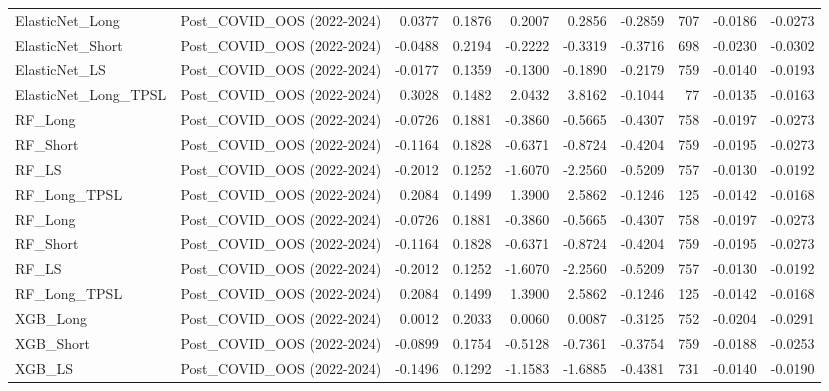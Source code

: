 \begin{tabular}{llrrrrrrrr}
\cline{1-10}
ElasticNet\_Long & Post\_COVID\_OOS (2022-2024) & 0.0377 & 0.1876 & 0.2007 & 0.2856 & -0.2859 & 707 & -0.0186 & -0.0273 \\
\cline{1-10}
ElasticNet\_Short & Post\_COVID\_OOS (2022-2024) & -0.0488 & 0.2194 & -0.2222 & -0.3319 & -0.3716 & 698 & -0.0230 & -0.0302 \\
\cline{1-10}
ElasticNet\_LS & Post\_COVID\_OOS (2022-2024) & -0.0177 & 0.1359 & -0.1300 & -0.1890 & -0.2179 & 759 & -0.0140 & -0.0193 \\
\cline{1-10}
ElasticNet\_Long\_TPSL & Post\_COVID\_OOS (2022-2024) & 0.3028 & 0.1482 & 2.0432 & 3.8162 & -0.1044 & 77 & -0.0135 & -0.0163 \\
\cline{1-10}
RF\_Long & Post\_COVID\_OOS (2022-2024) & -0.0726 & 0.1881 & -0.3860 & -0.5665 & -0.4307 & 758 & -0.0197 & -0.0273 \\
\cline{1-10}
RF\_Short & Post\_COVID\_OOS (2022-2024) & -0.1164 & 0.1828 & -0.6371 & -0.8724 & -0.4204 & 759 & -0.0195 & -0.0273 \\
\cline{1-10}
RF\_LS & Post\_COVID\_OOS (2022-2024) & -0.2012 & 0.1252 & -1.6070 & -2.2560 & -0.5209 & 757 & -0.0130 & -0.0192 \\
\cline{1-10}
RF\_Long\_TPSL & Post\_COVID\_OOS (2022-2024) & 0.2084 & 0.1499 & 1.3900 & 2.5862 & -0.1246 & 125 & -0.0142 & -0.0168 \\
\cline{1-10}
RF\_Long & Post\_COVID\_OOS (2022-2024) & -0.0726 & 0.1881 & -0.3860 & -0.5665 & -0.4307 & 758 & -0.0197 & -0.0273 \\
\cline{1-10}
RF\_Short & Post\_COVID\_OOS (2022-2024) & -0.1164 & 0.1828 & -0.6371 & -0.8724 & -0.4204 & 759 & -0.0195 & -0.0273 \\
\cline{1-10}
RF\_LS & Post\_COVID\_OOS (2022-2024) & -0.2012 & 0.1252 & -1.6070 & -2.2560 & -0.5209 & 757 & -0.0130 & -0.0192 \\
\cline{1-10}
RF\_Long\_TPSL & Post\_COVID\_OOS (2022-2024) & 0.2084 & 0.1499 & 1.3900 & 2.5862 & -0.1246 & 125 & -0.0142 & -0.0168 \\
\cline{1-10}
XGB\_Long & Post\_COVID\_OOS (2022-2024) & 0.0012 & 0.2033 & 0.0060 & 0.0087 & -0.3125 & 752 & -0.0204 & -0.0291 \\
\cline{1-10}
XGB\_Short & Post\_COVID\_OOS (2022-2024) & -0.0899 & 0.1754 & -0.5128 & -0.7361 & -0.3754 & 759 & -0.0188 & -0.0253 \\
\cline{1-10}
XGB\_LS & Post\_COVID\_OOS (2022-2024) & -0.1496 & 0.1292 & -1.1583 & -1.6885 & -0.4381 & 731 & -0.0140 & -0.0190 \\
\cline{1-10}

\end{tabular}
